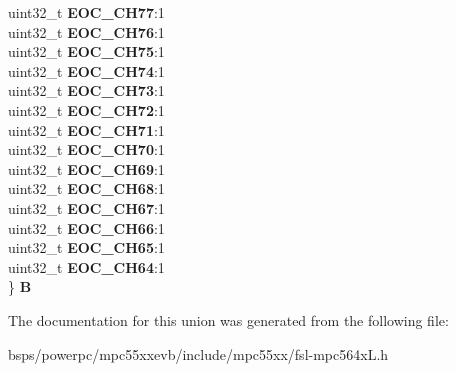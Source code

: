 \begin{DoxyCompactItemize}
\begin{tabbing}
\>uint32\_t {\bfseries EOC\_CH77}:1\\
\>uint32\_t {\bfseries EOC\_CH76}:1\\
\>uint32\_t {\bfseries EOC\_CH75}:1\\
\>uint32\_t {\bfseries EOC\_CH74}:1\\
\>uint32\_t {\bfseries EOC\_CH73}:1\\
\>uint32\_t {\bfseries EOC\_CH72}:1\\
\>uint32\_t {\bfseries EOC\_CH71}:1\\
\>uint32\_t {\bfseries EOC\_CH70}:1\\
\>uint32\_t {\bfseries EOC\_CH69}:1\\
\>uint32\_t {\bfseries EOC\_CH68}:1\\
\>uint32\_t {\bfseries EOC\_CH67}:1\\
\>uint32\_t {\bfseries EOC\_CH66}:1\\
\>uint32\_t {\bfseries EOC\_CH65}:1\\
\>uint32\_t {\bfseries EOC\_CH64}:1\\
\} {\bfseries B}\\

\end{tabbing}\end{DoxyCompactItemize}


The documentation for this union was generated from the following file\+:\begin{DoxyCompactItemize}
\item 
bsps/powerpc/mpc55xxevb/include/mpc55xx/fsl-\/mpc564x\+L.\+h\end{DoxyCompactItemize}
